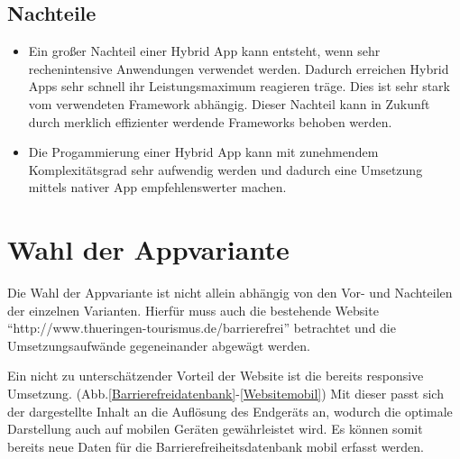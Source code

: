 \subsection{Nachteile}
\label{sec:hybrid:cons}

\begin{itemize}

	\item Ein großer Nachteil einer Hybrid App kann entsteht, wenn sehr rechenintensive Anwendungen verwendet werden. Dadurch erreichen Hybrid Apps sehr schnell ihr Leistungsmaximum reagieren träge. Dies ist sehr stark vom verwendeten Framework abhängig. Dieser Nachteil kann in Zukunft durch merklich effizienter werdende Frameworks behoben werden.

	\item Die Progammierung einer Hybrid App kann mit zunehmendem Komplexitätsgrad sehr aufwendig werden und dadurch eine Umsetzung mittels nativer App empfehlenswerter machen.

\end{itemize}

\section{Wahl der Appvariante}
\label{sec:intro:Appvariante}

Die Wahl der Appvariante ist nicht allein abhängig von den Vor- und Nachteilen der einzelnen Varianten. Hierfür muss auch die bestehende Website ``http://www.thueringen-tourismus.de/barrierefrei'' betrachtet und die Umsetzungsaufwände gegeneinander abgewägt werden.

Ein nicht zu unterschätzender Vorteil der Website ist die bereits responsive Umsetzung. (Abb.\ref{Barrierefreidatenbank}-\ref{Websitemobil}) Mit dieser passt sich der dargestellte Inhalt an die Auflösung des Endgeräts an, wodurch die optimale Darstellung auch auf mobilen Geräten gewährleistet wird. Es können somit bereits neue Daten für die Barrierefreiheitsdatenbank mobil erfasst werden.

